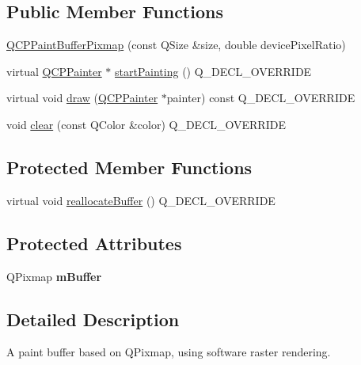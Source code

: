 \subsection*{Public Member Functions}
\begin{DoxyCompactItemize}
\item 
\hyperlink{classQCPPaintBufferPixmap_aef0224e03b9285509391fcd61a8e6844}{Q\+C\+P\+Paint\+Buffer\+Pixmap} (const Q\+Size \&size, double device\+Pixel\+Ratio)
\item 
virtual \hyperlink{classQCPPainter}{Q\+C\+P\+Painter} $\ast$ \hyperlink{classQCPPaintBufferPixmap_a357964ef7d28cfa530338be4e5c93234}{start\+Painting} () Q\+\_\+\+D\+E\+C\+L\+\_\+\+O\+V\+E\+R\+R\+I\+DE
\item 
virtual void \hyperlink{classQCPPaintBufferPixmap_af7bfc685e56a0a9329e57cd9a265eb74}{draw} (\hyperlink{classQCPPainter}{Q\+C\+P\+Painter} $\ast$painter) const Q\+\_\+\+D\+E\+C\+L\+\_\+\+O\+V\+E\+R\+R\+I\+DE
\item 
void \hyperlink{classQCPPaintBufferPixmap_a14badbd010a3cde6b55817ccb7b65217}{clear} (const Q\+Color \&color) Q\+\_\+\+D\+E\+C\+L\+\_\+\+O\+V\+E\+R\+R\+I\+DE
\end{DoxyCompactItemize}
\subsection*{Protected Member Functions}
\begin{DoxyCompactItemize}
\item 
virtual void \hyperlink{classQCPPaintBufferPixmap_ad49f3205ba3463b1c44f8db3cfcc90f0}{reallocate\+Buffer} () Q\+\_\+\+D\+E\+C\+L\+\_\+\+O\+V\+E\+R\+R\+I\+DE
\end{DoxyCompactItemize}
\subsection*{Protected Attributes}
\begin{DoxyCompactItemize}
\item 
\mbox{\label{classQCPPaintBufferPixmap_a6d7009f45f03e305f2dc00e52a9225f8}} 
Q\+Pixmap {\bfseries m\+Buffer}
\end{DoxyCompactItemize}


\subsection{Detailed Description}
A paint buffer based on Q\+Pixmap, using software raster rendering. 

